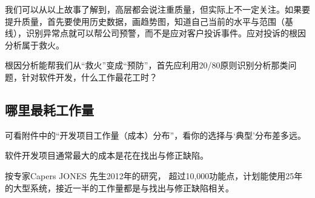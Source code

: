 我们可以从以上故事了解到，高层都会说注重质量，但实际上不一定关注。如果要提升质量，首先要使用历史数据，画趋势图，知道自己当前的水平与范围（基线），识别异常点就可以帮公司预警，而不是应对客户投诉事件。应对投诉的根因分析属于救火。

\begin{description}
\item[]
\begin{description}
\tightlist
\item[]
= = =
\end{description}
\end{description}

根因分析能帮我们从``救火''变成``预防''，首先应利用20/80原则识别分析那类问题，针对软件开发，什么工作最花工时？

\hypertarget{ux54eaux91ccux6700ux8017ux5de5ux4f5cux91cf}{%
\subsection{哪里最耗工作量}\label{ux54eaux91ccux6700ux8017ux5de5ux4f5cux91cf}}


可看附件中的``开发项目工作量（成本）分布''，看你的选择与`典型'分布差多远。

软件开发项目通常最大的成本是花在找出与修正缺陷。

按专家Capers JONES 先生2012年的研究，
超过10,000功能点，计划能使用25年的大型系统，接近一半的工作量都是与找出与修正缺陷相关。

\begin{description}
\item[]
\begin{description}
\tightlist
\item[]
= = =
\end{description}
\end{description}

